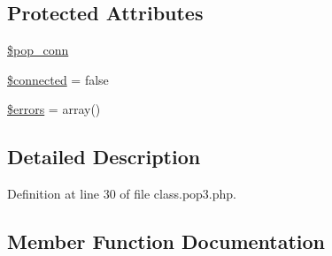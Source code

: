\subsection*{Protected Attributes}
\begin{DoxyCompactItemize}
\item 
\hyperlink{class_p_o_p3_ae846263e987b8fece9591cc0c2566b50}{\$pop\+\_\+conn}
\item 
\hyperlink{class_p_o_p3_adb9756d4524181e191069eaa76afb6cf}{\$connected} = false
\item 
\hyperlink{class_p_o_p3_ab24faf4aa647cdcee494fc48524ad4ff}{\$errors} = array()
\end{DoxyCompactItemize}


\subsection{Detailed Description}


Definition at line 30 of file class.\+pop3.\+php.



\subsection{Member Function Documentation}
